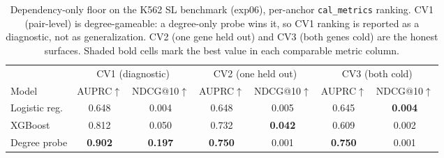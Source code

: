 \begin{table}[!htbp]
  \centering
  \caption{Dependency-only floor on the K562 SL benchmark (exp06), per-anchor \texttt{cal\_metrics} ranking. CV1 (pair-level) is degree-gameable: a degree-only probe wins it, so CV1 ranking is reported as a diagnostic, not as generalization. CV2 (one gene held out) and CV3 (both genes cold) are the honest surfaces. Shaded bold cells mark the best value in each comparable metric column.}
  \label{tab:floor}
  \setlength{\tabcolsep}{4pt}
  \begin{tabular}{lcccccc}
    \toprule
    & \multicolumn{2}{c}{CV1 (diagnostic)} & \multicolumn{2}{c}{CV2 (one held out)} & \multicolumn{2}{c}{CV3 (both cold)} \\
    \cmidrule(lr){2-3}\cmidrule(lr){4-5}\cmidrule(lr){6-7}
    Model & AUPRC$\uparrow$ & NDCG@10$\uparrow$ & AUPRC$\uparrow$ & NDCG@10$\uparrow$ & AUPRC$\uparrow$ & NDCG@10$\uparrow$ \\
    \midrule
    Logistic reg. & 0.648 & 0.004 & 0.648 & 0.005 & 0.645 & \cellcolor{hl}\textbf{0.004} \\
    XGBoost & 0.812 & 0.050 & 0.732 & \cellcolor{hl}\textbf{0.042} & 0.609 & 0.002 \\
    Degree probe & \cellcolor{hl}\textbf{0.902} & \cellcolor{hl}\textbf{0.197} & \cellcolor{hl}\textbf{0.750} & 0.001 & \cellcolor{hl}\textbf{0.750} & 0.001 \\
    \bottomrule
  \end{tabular}
\end{table}
